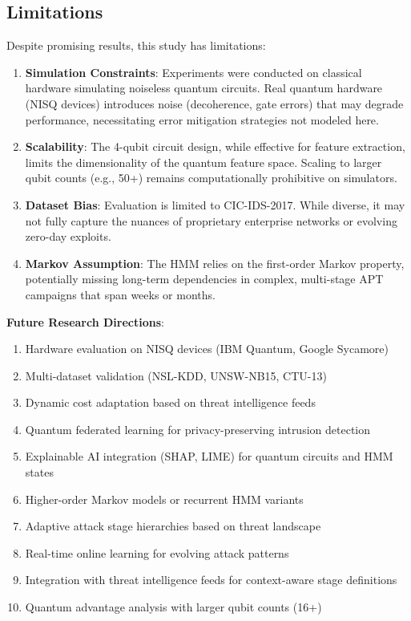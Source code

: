 \documentclass[conference]{IEEEtran}
\begin{document}
\subsection{Limitations}
Despite promising results, this study has limitations:
\begin{enumerate}
    \item \textbf{Simulation Constraints}: Experiments were conducted on classical hardware simulating noiseless quantum circuits. Real quantum hardware (NISQ devices) introduces noise (decoherence, gate errors) that may degrade performance, necessitating error mitigation strategies not modeled here.
    \item \textbf{Scalability}: The 4-qubit circuit design, while effective for feature extraction, limits the dimensionality of the quantum feature space. Scaling to larger qubit counts (e.g., 50+) remains computationally prohibitive on simulators.
    \item \textbf{Dataset Bias}: Evaluation is limited to CIC-IDS-2017. While diverse, it may not fully capture the nuances of proprietary enterprise networks or evolving zero-day exploits.
    \item \textbf{Markov Assumption}: The HMM relies on the first-order Markov property, potentially missing long-term dependencies in complex, multi-stage APT campaigns that span weeks or months.
\end{enumerate}

\textbf{Future Research Directions}:
\begin{enumerate}
    \item Hardware evaluation on NISQ devices (IBM Quantum, Google Sycamore)
    \item Multi-dataset validation (NSL-KDD, UNSW-NB15, CTU-13)
    \item Dynamic cost adaptation based on threat intelligence feeds
    \item Quantum federated learning for privacy-preserving intrusion detection
    \item Explainable AI integration (SHAP, LIME) for quantum circuits and HMM states
    \item Higher-order Markov models or recurrent HMM variants
    \item Adaptive attack stage hierarchies based on threat landscape
    \item Real-time online learning for evolving attack patterns
    \item Integration with threat intelligence feeds for context-aware stage definitions
    \item Quantum advantage analysis with larger qubit counts (16+)
\end{enumerate}
\end{document}

